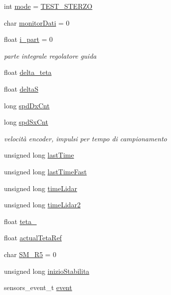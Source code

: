 \begin{DoxyCompactItemize}
int \mbox{\hyperlink{ari_pi__2_d_c__esp__08_8ino_a1ea5d0cb93f22f7d0fdf804bd68c3326}{mode}} = \mbox{\hyperlink{ari_pi__2_d_c__esp__08_8ino_a3e6a2d7b0da74a50b9fd5b16aace4414}{T\+E\+S\+T\+\_\+\+S\+T\+E\+R\+ZO}}
\item 
char \mbox{\hyperlink{ari_pi__2_d_c__esp__08_8ino_ae2c1c9186b3f289530624f44f4e698d7}{monitor\+Dati}} = 0
\item 
float \mbox{\hyperlink{ari_pi__2_d_c__esp__08_8ino_a76da74d153b9813dd1e568a77a05707b}{i\+\_\+part}} = 0
\begin{DoxyCompactList}\small\item\em parte integrale regolatore guida \end{DoxyCompactList}\item 
float \mbox{\hyperlink{ari_pi__2_d_c__esp__08_8ino_aac1a5446ad100de2f39ea367994f0766}{delta\+\_\+teta}}
\item 
float \mbox{\hyperlink{ari_pi__2_d_c__esp__08_8ino_a7fa6816c80e0264d9018d4e59f5a79cd}{deltaS}}
\item 
long \mbox{\hyperlink{ari_pi__2_d_c__esp__08_8ino_adb09a635e5dce1cb72809b635590795f}{spd\+Dx\+Cnt}}
\item 
long \mbox{\hyperlink{ari_pi__2_d_c__esp__08_8ino_ad968c532014efdd0469f8476af86bbbc}{spd\+Sx\+Cnt}}
\begin{DoxyCompactList}\small\item\em velocità encoder, impulsi per tempo di campionamento \end{DoxyCompactList}\item 
unsigned long \mbox{\hyperlink{ari_pi__2_d_c__esp__08_8ino_a22cb446e5271d5d2c4b2e23792fb1966}{last\+Time}}
\item 
unsigned long \mbox{\hyperlink{ari_pi__2_d_c__esp__08_8ino_a952f8b93b7670156479bc642b5af6ab8}{last\+Time\+Fast}}
\item 
unsigned long \mbox{\hyperlink{ari_pi__2_d_c__esp__08_8ino_a458b4f86617930d87d3a7540cd482f64}{time\+Lidar}}
\item 
unsigned long \mbox{\hyperlink{ari_pi__2_d_c__esp__08_8ino_aa30c6b55fe4f49c1e056ee1ae129063f}{time\+Lidar2}}
\item 
float \mbox{\hyperlink{ari_pi__2_d_c__esp__08_8ino_ab50fa34f1f6d47cde8715ac543a3b0dd}{teta\+\_\+}}
\item 
float \mbox{\hyperlink{ari_pi__2_d_c__esp__08_8ino_ae431043be26faf1019f48badf3fbfc45}{actual\+Teta\+Ref}}
\item 
char \mbox{\hyperlink{ari_pi__2_d_c__esp__08_8ino_ad2b58fa9c2d105a6d47c2c3b778557c1}{S\+M\+\_\+\+R5}} = 0
\item 
unsigned long \mbox{\hyperlink{ari_pi__2_d_c__esp__08_8ino_a91db8b0a01ba006126af6bb35384e18f}{inizio\+Stabilita}}
\item 
sensors\+\_\+event\+\_\+t \mbox{\hyperlink{ari_pi__2_d_c__esp__08_8ino_a40ecda65c4ebce49fa139666f210bef0}{event}}
\end{DoxyCompactItemize}


